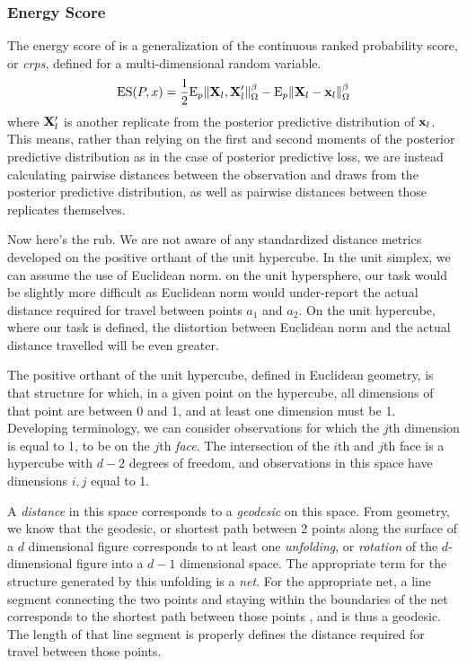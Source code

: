 \subsubsection{Energy Score}
The energy score of \cite{gneiting2007} is a generalization of the continuous ranked probability
  score, or \emph{crps}, defined for a multi-dimensional random variable.
  \begin{equation}
    \label{eq:es}
    \text{ES}(P,x) = \frac{1}{2}\text{E}_p\lVert {\bf X}_l,{\bf X}_l^{\prime}\rVert_{\Omega}^{\beta} -
                            \text{E}_p\lVert {\bf X}_l - {\bf x}_l\rVert_{\Omega}^{\beta}
  \end{equation}
  where ${\bf X}_l^{\prime}$ is another replicate from the posterior predictive distribution
  of ${\bf x}_l$. This means, rather than relying on the first and second moments of the posterior
  predictive distribution as in the case of posterior predictive loss, we are instead calculating
  pairwise distances between the observation and draws from the posterior predictive distribution,
  as well as pairwise distances between those replicates themselves.

Now here's the rub.  We are not aware of any standardized distance metrics developed on the
  positive orthant of the unit hypercube.  In the unit simplex, we can assume the use of
  Euclidean norm.  on the unit hypersphere, our task would be slightly more difficult as
  Euclidean norm would under-report the actual distance required for travel between points $a_1$
  and $a_2$.  On the unit hypercube, where our task is defined, the distortion between Euclidean
  norm and the actual distance travelled will be even greater.

The positive orthant of the unit hypercube, defined in Euclidean geometry, is that structure for
  which, in a given point on the hypercube, all dimensions of that point are between 0 and 1, and
  at least one dimension must be 1.  Developing terminology, we can consider observations for which
  the $j$th dimension is equal to 1, to be on the $j$th \emph{face}.  The intersection of the $i$th
  and $j$th face is a hypercube with $d-2$ degrees of freedom, and observations in this space have
  dimensions $i,j$ equal to 1.

A \emph{distance} in this space corresponds to a \emph{geodesic} on this space. From geometry, we
  know that the geodesic, or shortest path between 2 points along the surface of a $d$ dimensional
  figure corresponds to at least one \emph{unfolding}, or \emph{rotation} of the $d$-dimensional
  figure into a $d-1$ dimensional space.  The appropriate term for the structure generated by this
  unfolding is a \emph{net}.  For the appropriate net, a line segment connecting the two points and
  staying within the boundaries of the net corresponds to the shortest path between those points
  , and is thus a geodesic.  The length of that line segment is properly
  defines the distance required for travel between those points.

